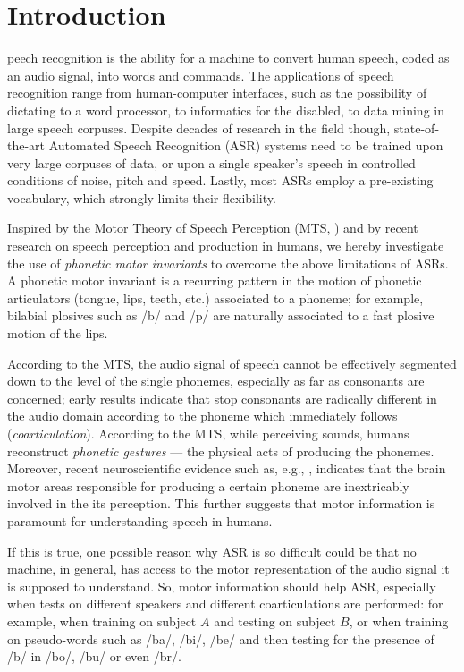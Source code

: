 \section{Introduction}
\label{sec:intro}

peech recognition is the ability for a machine to convert
human speech, coded as an audio signal, into words and commands. The
applications of speech recognition range from human-computer interfaces,
such as the possibility of dictating to a word processor, to informatics
for the disabled, to data mining in large speech corpuses. Despite decades
of research in the field though, state-of-the-art Automated Speech Recognition
(ASR) systems need to be trained upon very large corpuses of data, or upon
a single speaker's speech in controlled conditions of noise, pitch and speed.
Lastly, most ASRs employ a pre-existing vocabulary, which strongly
limits their flexibility.

Inspired by the Motor Theory of Speech Perception (MTS, \cite{...}) and by
recent research on speech perception and production in humans, we
hereby investigate the use of \emph{phonetic motor invariants} to overcome
the above limitations of ASRs. A phonetic motor invariant is a recurring
pattern in the motion of phonetic articulators (tongue, lips, teeth, etc.)
associated to a phoneme; for example, bilabial plosives such as /b/ and /p/
are naturally associated to a fast plosive motion of the lips. 

According to the MTS, the audio signal of speech cannot be
effectively segmented down to the level of the single phonemes, especially
as far as consonants are concerned; early results \cite{...} indicate that stop consonants are
radically different in the audio domain according to the phoneme which
immediately follows (\emph{coarticulation}). According to the MTS,
while perceiving sounds, humans reconstruct \emph{phonetic gestures}
--- the physical acts of producing the phonemes.
Moreover, recent neuroscientific evidence such as, e.g., \cite{dausilio},
indicates that the brain motor areas responsible for producing a certain
phoneme are inextricably involved in the its perception. This further suggests
that motor information is paramount for understanding speech in humans.

If this is true, one possible reason why ASR is so difficult could be that no
machine, in general, has access to the motor representation of the
audio signal it is supposed to understand. So, motor information should
help ASR, especially when tests on different speakers and different
coarticulations are performed: for example, when training on subject $A$ and
testing on subject $B$, or when training on pseudo-words such as /ba/, /bi/,
/be/ and then testing for the presence of /b/ in /bo/, /bu/ or even /br/.

